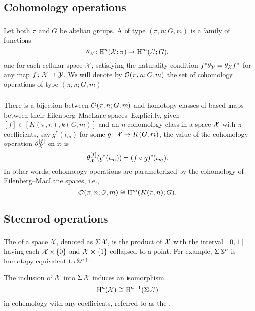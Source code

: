 \subsection{Cohomology operations}

\subsubsection{}
Let both $\pi$ and $G$ be abelian groups.
A  of type $(\pi, n; G, m)$ is a family of functions
\[
\theta_{\mathcal{X}} \colon \mathrm{H}^n(\mathcal{X}; \pi) \to \mathrm{H}^m(\mathcal{X}; G),
\]
one for each cellular space $\mathcal{X}$, satisfying the naturality condition $f^* \theta_{\mathcal{Y}} = \theta_{\mathcal{X}} f^*$ for any map $f \colon \mathcal{X} \to \mathcal{Y}$.
We will denote by $\mathcal{O}(\pi, n; G,m)$ the set of cohomology operations of type $(\pi, n; G,m)$.

\subsubsection{}
There is a bijection between $\mathcal{O}(\pi, n; G,m)$ and homotopy classes of based maps between their Eilenberg--MacLane spaces.
Explicitly, given $[f] \in [K(\pi,n), k(G,m)]$ and an $n$-cohomology class in a space $\mathcal{X}$ with $\pi$ coefficients, say $g^*(\iota_m)$ for some $g \colon \mathcal{X} \to K(G, m)$, the value of the cohomology operation $\theta_{\mathcal{X}}^{[f]}$ on it is
\[
\theta_{\mathcal{X}}^{[f]}(g^*(\iota_m)) = (f \circ g)^*(\iota_m).
\]
In other words, cohomology operations are parameterized by the cohomology of Eilenberg--MacLane spaces, i.e.,
\[
\mathcal{O}(\pi, n; G,m) \cong \mathrm{H}^m(K(\pi,n); G).
\]

\subsection{Steenrod operations}\label{ss:steenrod}

\subsubsection{}

The  of a space $\mathcal{X}$, denoted as $\operatorname{\Sigma} \mathcal{X}$, is the product of $\mathcal{X}$ with the interval $[0,1]$ having each $\mathcal{X} \times \{0\}$ and $\mathcal{X} \times \{1\}$ collapsed to a point.
For example, $\operatorname{\Sigma} \mathbb{S}^n$ is homotopy equivalent to $\mathbb{S}^{n+1}$.

The inclusion of $\mathcal{X}$ into $\operatorname{\Sigma} \mathcal{X}$ induces an isomorphism
\[
\mathrm{H}^n(\mathcal{X}) \cong \mathrm{H}^{n+1}(\operatorname{\Sigma} \mathcal{X})
\]
in cohomology with any coefficients, referred to as the .

